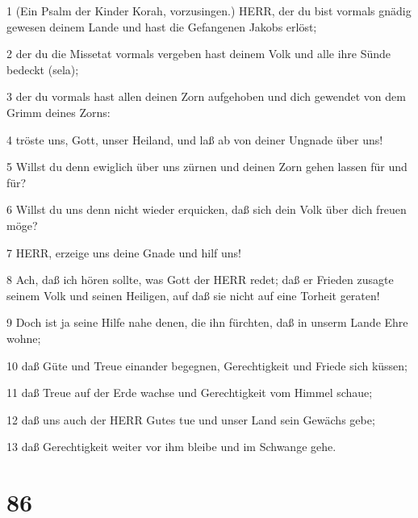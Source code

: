 \par 1 (Ein Psalm der Kinder Korah, vorzusingen.) HERR, der du bist vormals gnädig gewesen deinem Lande und hast die Gefangenen Jakobs erlöst;
\par 2 der du die Missetat vormals vergeben hast deinem Volk und alle ihre Sünde bedeckt (sela);
\par 3 der du vormals hast allen deinen Zorn aufgehoben und dich gewendet von dem Grimm deines Zorns:
\par 4 tröste uns, Gott, unser Heiland, und laß ab von deiner Ungnade über uns!
\par 5 Willst du denn ewiglich über uns zürnen und deinen Zorn gehen lassen für und für?
\par 6 Willst du uns denn nicht wieder erquicken, daß sich dein Volk über dich freuen möge?
\par 7 HERR, erzeige uns deine Gnade und hilf uns!
\par 8 Ach, daß ich hören sollte, was Gott der HERR redet; daß er Frieden zusagte seinem Volk und seinen Heiligen, auf daß sie nicht auf eine Torheit geraten!
\par 9 Doch ist ja seine Hilfe nahe denen, die ihn fürchten, daß in unserm Lande Ehre wohne;
\par 10 daß Güte und Treue einander begegnen, Gerechtigkeit und Friede sich küssen;
\par 11 daß Treue auf der Erde wachse und Gerechtigkeit vom Himmel schaue;
\par 12 daß uns auch der HERR Gutes tue und unser Land sein Gewächs gebe;
\par 13 daß Gerechtigkeit weiter vor ihm bleibe und im Schwange gehe.

\chapter{86}

